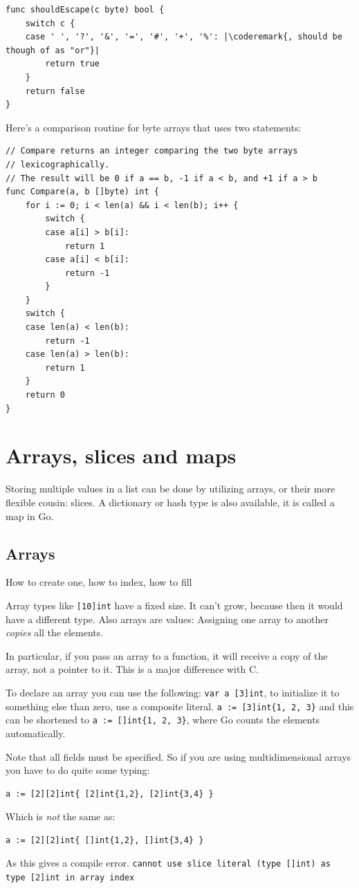 \begin{lstlisting}
func shouldEscape(c byte) bool {
    switch c {
    case ' ', '?', '&', '=', '#', '+', '%': |\coderemark{, should be though of as "or"}|
        return true
    }
    return false
}
\end{lstlisting}
Here's a comparison routine for byte arrays that uses two  statements:

\begin{lstlisting}
// Compare returns an integer comparing the two byte arrays
// lexicographically.
// The result will be 0 if a == b, -1 if a < b, and +1 if a > b
func Compare(a, b []byte) int {
    for i := 0; i < len(a) && i < len(b); i++ {
        switch {
        case a[i] > b[i]:
            return 1
        case a[i] < b[i]:
            return -1
        }
    }
    switch {
    case len(a) < len(b):
        return -1
    case len(a) > len(b):
        return 1
    }
    return 0
}
\end{lstlisting}

\section{Arrays, slices and maps}
Storing multiple values in a list can be done by utilizing arrays, or
their more flexible cousin: slices. A dictionary or hash type is also
available, it is called a map in Go.

\subsection{Arrays}
How to create one, how to index, how to fill


Array types like \lstinline{[10]int} have a fixed size.
It can't grow, because then it would have a different type. Also arrays
are values: Assigning one array to another \emph{copies} all the elements.

In particular, if you pass an array to a function, it will receive a
copy of the array, not a pointer to it. This is a major difference with C.

To declare an array you can use the following: \lstinline{var a [3]int},
to initialize it to something else than zero, use a composite literal.
\lstinline|a := [3]int{1, 2, 3}| and
this can be shortened to \lstinline|a := []int{1, 2, 3}|, where Go counts
the elements automatically.

Note that all fields must be specified.  So if you are using multidimensional
arrays you have to do quite some typing:
\begin{lstlisting}
a := [2][2]int{ [2]int{1,2}, [2]int{3,4} }
\end{lstlisting}
Which is \emph{not} the same as:
\begin{lstlisting}
a := [2][2]int{ []int{1,2}, []int{3,4} }
\end{lstlisting}
As this gives a compile error.\newline
\lstinline{cannot use slice literal (type []int) as type [2]int in array index}

